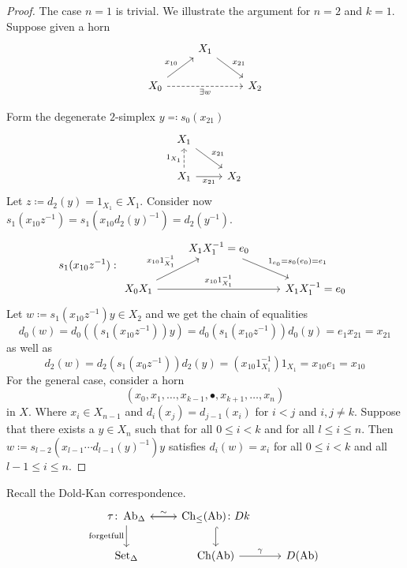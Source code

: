 \begin{proof}
    The case $n=1$ is trivial.
    We illustrate the argument for $n=2$ and $k=1$.
    Suppose given a horn 
    \[
    \begin{tikzcd}
        &
        X_1
        \arrow[rd, "x_{21}"]
        & \\
        X_0
        \arrow[ru, "x_{10}"]
        \arrow[rr, dashed, "\exists w"']
        &&
        X_2
    \end{tikzcd}
    \]

    Form the degenerate $2$-simplex $y \eqqcolon s_0(x_{21})$
    \[
    \begin{tikzcd}
        X_1
        \arrow[rd, "x_{21}"]
        &
        \\
        X_1
        \arrow[u, dashed, "1_{X_1}"]
        \arrow[r, "x_{21}"']
        &
        X_2
    \end{tikzcd}
    \]
    Let $z \coloneqq d_2(y) = 1_{X_1} \in X_1$.
    Consider now $s_1(x_{10}z^{-1})=s_1(x_{10}d_2(y)^{-1})=d_2(y^{-1})$.
    \[
    s_1(x_{10}z^{-1}):
    \begin{tikzcd}
        &
        X_1X_1^{-1}=e_0
        \arrow[rd, "1_{e_0}=s_0(e_0)=e_1"]
        &
        \\
        X_0X_1
        \arrow[ru, "x_{10}1_{X_1}^{-1}"]
        \arrow[rr, "x_{10}1_{X_1}^{-1}"]
        &&
        X_1X_1^{-1}=e_0
    \end{tikzcd}
    \]
    Let $w \coloneqq s_1(x_{10}z^{-1})y\in X_2$ and we get the chain of equalities
    \[
        d_0(w)=d_0((s_1(x_{10}z^{-1}))y)=d_0(s_1(x_{10}z^{-1}))d_0(y)=e_1x_{21}=x_{21}
    \]
    as well as 
    \[
    d_2(w)=d_2(s_1(x_0z^{-1}))d_2(y)=(x_{10}1_{X_1}^{-1})1_{X_1}=x_{10}e_1=x_{10}
    \]
    For the general case, consider a horn 
    \[
    (x_0,x_1,\dotsc, x_{k-1},\bullet,x_{k+1},\dotsc,x_n) 
    \]
    in $X$. Where $x_i \in X_{n-1}$ and $ d_i(x_j)=d_{j-1}(x_i)$ for $i<j$ and $i,j \neq k$.
    Suppose that there exists a $y \in X_n$ such that for all $ 0 \leq i < k$ and for all $l \leq i \leq n$.
    Then $w \coloneqq s_{l-2}(x_{l-1}\dotsm d_{l-1}(y)^{-1})y$ satisfies $d_i(w)=x_i$ for all $0 \leq i <k$ and all $l-1\leq i \leq n$.
\end{proof}

Recall the Dold-Kan correspondence.
\[
\begin{tikzcd}
    \tau \colon \Ab_{\Delta}
    \arrow[d, "\text{forgetfull}"']
    \arrow[r,"\sim"]
    &
    \Ch_{\leq} (\Ab)\colon Dk
    \arrow[l]
    \arrow[d, hook]
    &
    \\
    \SetD
    &
    \Ch(\Ab)
    \arrow[r,"\gamma"]
    &
    D(\Ab)
\end{tikzcd}
\]

